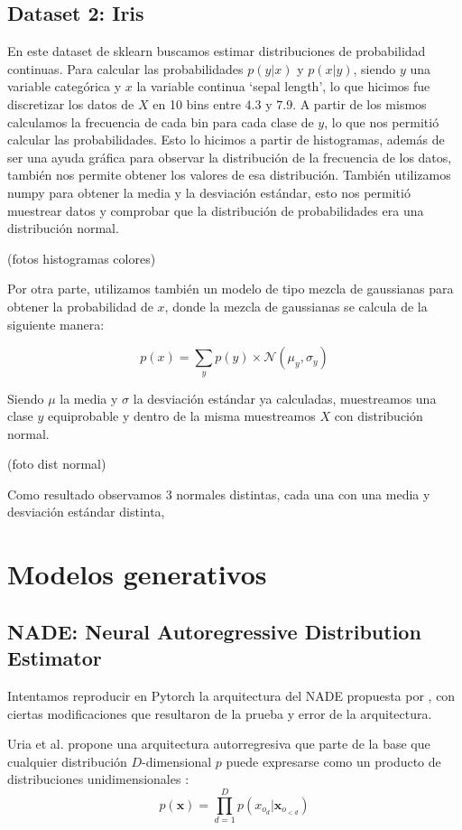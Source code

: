 \documentclass[11pt]{article}
\begin{document}
\subsection{Dataset 2: Iris}
En este dataset de sklearn buscamos estimar distribuciones de probabilidad continuas. Para calcular las probabilidades $p(y|x)$ y $p(x|y)$, siendo $y$ una variable categórica y $x$ la variable continua `sepal length’, lo que hicimos fue discretizar los datos de $X$ en 10 bins entre $4.3$ y $7.9$. A partir de los mismos calculamos la frecuencia de cada bin para cada clase de $y$, lo que nos permitió calcular las probabilidades. Esto lo hicimos a partir de histogramas, además de ser una ayuda gráfica para observar la distribución de la frecuencia de los datos, también nos permite obtener los valores de esa distribución. También utilizamos numpy para obtener la media y la desviación estándar, esto nos permitió muestrear datos y comprobar que la distribución de probabilidades era una distribución normal.  

(fotos histogramas colores)

Por otra parte, utilizamos también un modelo de tipo mezcla de gaussianas para obtener la probabilidad de $x$, donde la mezcla de gaussianas se calcula de la siguiente manera:

$$
p(x) = \sum_y p(y) \times \mathcal{N}(\mu_y, \sigma_y)
$$ 

Siendo $\mu$ la media y $\sigma$ la desviación estándar ya calculadas, muestreamos una clase $y$ equiprobable y dentro de la misma muestreamos $X$ con distribución normal. 

(foto dist normal)

Como resultado observamos 3 normales distintas, cada una con una media y desviación estándar distinta, 

\newpage

\section{Modelos generativos}
\subsection{NADE: Neural Autoregressive Distribution Estimator}

Intentamos reproducir en Pytorch la arquitectura del NADE propuesta por \cite{nade}, con ciertas modificaciones que resultaron de la prueba y error de la arquitectura.

Uria et al. propone una arquitectura autorregresiva que parte de la base que cualquier distribución $D$-dimensional $p$ puede expresarse como un producto de distribuciones unidimensionales \cite{nade}:
$$
p(\boldsymbol{x}) = \prod_{d=1}^{D}p(x_{o_d} | \boldsymbol{x}_{o_{<d}})
$$
\end{document}
